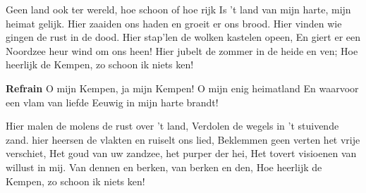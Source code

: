 \footnotemark [
ititle={O mijn Kempen}]


\beginverse
Geen land ook ter wereld, hoe schoon of hoe rijk
Is 't land van mijn harte, mijn heimat gelijk.
Hier zaaiden ons haden en groeit er ons brood.
Hier vinden wie gingen de rust in de dood.
Hier stap'len de wolken kastelen opeen,
En giert er een Noordzee heur wind om ons heen!
Hier jubelt de zommer in de heide en ven;
Hoe heerlijk de Kempen, zo schoon ik niets ken!
\endverse

\beginchorus
\textbf{Refrain}
O mijn Kempen, ja mijn Kempen!
O mijn enig heimatland
En waarvoor een vlam van liefde
Eeuwig in mijn harte brandt!
\endverse

\beginverse
Hier malen de molens de rust over 't land,
Verdolen de wegels in 't stuivende zand.
hier heersen de vlakten en ruiselt ons lied,
Beklemmen geen verten het vrije verschiet,
Het goud van uw zandzee, het purper der hei,
Het tovert visioenen van willust in mij.
Van dennen en berken, van berken en den,
Hoe heerlijk de Kempen, zo schoon ik niets ken!
\endverse
\endsong
